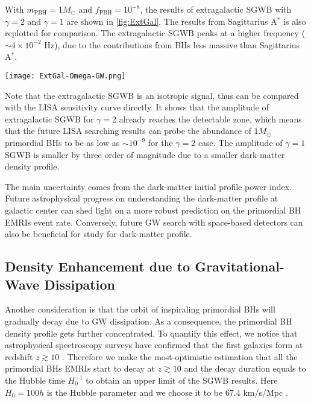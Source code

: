 With  $m_\text{PBH} = 1 M_\odot$ and $f_\text{PBH}=10^{-8}$, the results of extragalactic \ac{SGWB}  with $\gamma=2$ and $\gamma=1$  are shown in \cref{fig:ExtGal}.
The results from Sagittarius A$^\ast$ is also replotted for comparison.
The extragalactic \ac{SGWB} peaks at a higher frequency ($\sim4\times 10^{-2}$ Hz), due to the contributions from \acp{BH} less massive than Sagittarius A$^\ast$.

\begin{figure*}[htbp]
   \centering
   \texttt{[image: ExtGal-Omega-GW.png]}
\caption{The \ac{SGWB} spectra from primordial \ac{BH} \acp{EMRI} surrounding Sagittarius A$^\ast$ (``Sgr A$^\ast$'') and the extragalactic massive \acp{BH} (``ExtGal'') in the redshift range $[0,5]$.
The mass of the primordial \ac{BH} mass is assumed to be $1 M_\odot$ and the abundance in dark matter is $10^{-8}$. 
The dark-matter initial profile power index is chosen to be $\gamma=1$ and $\gamma=2$, respectively.
The $\gamma=2$ extragalactic \ac{SGWB} already reaches the detectable zone of LISA.
 }\label{fig:ExtGal}
\end{figure*}

Note that the extragalactic \ac{SGWB} is an isotropic signal, thus can be compared with the \ac{LISA} sensitivity curve directly. It shows that the amplitude of extragalactic \ac{SGWB}  for $\gamma=2$ already reaches the detectable zone, which means that the future LISA searching results can probe the abundance of $1 M_\odot$ primordial \acp{BH} to be as low as $\sim 10^{-9}$ for the $\gamma=2$ case.
The amplitude of $\gamma=1$ \ac{SGWB} is smaller by three order of magnitude due to a smaller dark-matter density profile.

The main uncertainty comes from the dark-matter initial profile power index. 
Future astrophysical progress on understanding the dark-matter profile at galactic center can shed light on a more robust prediction on the primordial \ac{BH} \acp{EMRI} event rate. 
Conversely, future \ac{GW} search with space-based detectors can also be beneficial for study for dark-matter profile.



\subsection{Density Enhancement due to Gravitational-Wave Dissipation}

Another consideration is that the orbit of inspiraling primordial \acp{BH} will gradually decay due to \ac{GW} dissipation. 
As a consequence, the primordial \ac{BH} density profile gets further concentrated.
To quantify this effect, we notice that astrophysical spectroscopy surveys have confirmed that the first galaxies form at redshift $z \gtrsim10$ \cite{FirstGalaxy}.
Therefore we make the most-optimistic estimation that all the primordial \acp{BH} \acp{EMRI} start to decay at $z \gtrsim 10$ and the decay duration equals to the Hubble time $H_0^{-1}$ to obtain an upper limit of the \ac{SGWB} results.
Here $H_0 = 100h$ is the Hubble parameter and we choose it to be $67.4$ km/s/Mpc \cite{Planck2018}.

